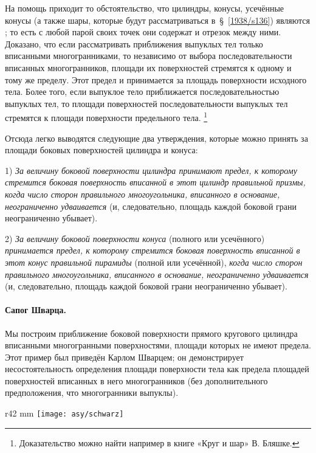 На помощь приходит то обстоятельство, что цилиндры, конусы, усечённые конусы (а также шары, которые будут рассматриваться в~§~\ref{1938/s136}) являются ; то есть с любой парой своих точек они содержат и отрезок между ними.
Доказано, что если рассматривать приближения выпуклых тел только  вписанными многогранниками, то независимо от выбора последовательности вписанных многогранников, площади их поверхностей стремятся к одному и тому же пределу.
Этот предел и принимается за площадь поверхности исходного тела. 
Более того, если выпуклое тело приближается последовательностью выпуклых тел,
то площади поверхностей последовательности выпуклых тел стремятся к площади поверхности предельного тела.%
\footnote{Доказательство можно найти например в книге «Круг и шар» В. Бляшке.}

Отсюда легко выводятся следующие два утверждения, которые можно принять за  площади боковых поверхностей цилиндра и конуса:

1) \emph{За величину боковой поверхности цилиндра принимают предел, к которому стремится боковая поверхность вписанной в этот цилиндр правильной призмы, когда число сторон правильного многоугольника, вписанного в основание, неограниченно удваивается} (и, следовательно, площадь каждой боковой грани неограниченно убывает).

2) \emph{За величину боковой поверхности конуса} (полного или усечённого) \emph{принимается предел, к которому стремится боковая поверхность вписанной в этот конус правильной пирамиды} (полной или усечённой), \emph{когда число сторон правильного многоугольника, вписанного в основание, неограниченно удваивается} (и, следовательно, площадь каждой боковой грани неограниченно убывает).

\paragraph{Сапог Шварца.}\label{fikhtengoltz/3-623b}
Мы построим приближение боковой поверхности прямого кругового цилиндра  вписанными многогранными поверхностями, площади которых не имеют предела.
Этот пример был приведён Карлом Шварцем; он демонстрирует несостоятельность определения площади поверхности тела как предела площадей поверхностей вписанных в него многогранников (без дополнительного предположения, что многогранники выпуклы).

\begin{wrapfigure}{r}{42 mm}
\centering
\texttt{[image: asy/schwarz]}
\caption{}
\label{jpg/schwarzscher_stiefel}
\end{wrapfigure}

